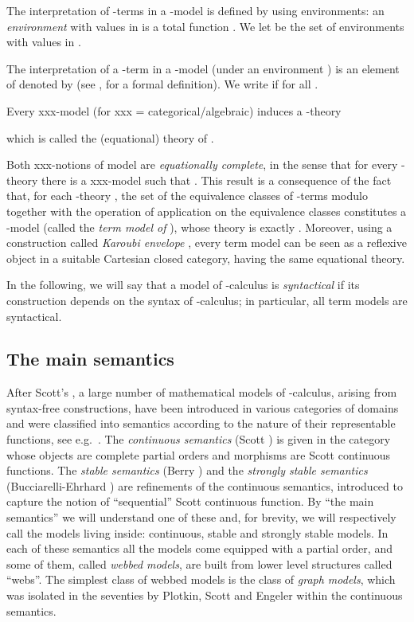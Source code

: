 \documentclass[english]{llncs}
\begin{document}
The interpretation of -terms in a -model  is defined by using environments:
an {\em environment} with values in  is a total function .
We let  be the set of environments with values in .

The interpretation of a -term  in a -model  (under an environment ) is an element of  denoted by  (see \cite[Def.~5.2.1(ii)]{Bare}, for a formal definition).
We write  if  for all .

Every {\sf xxx}-model  (for {\sf xxx} = categorical/algebraic) induces a -theory 

which is called the (equational) theory of .

Both {\sf xxx}-notions of model are {\em equationally complete}, in the sense that for every -theory  there is a {\sf xxx}-model  such that .
This result is a consequence of the fact that, for each -theory , the set of the equivalence classes of -terms modulo 
 together with the operation of application on the equivalence classes constitutes a -model  (called the {\em term model of }), 
whose theory is exactly  \cite[Cor.~5.2.13(ii)]{Bare}.
Moreover, using a construction called {\em Karoubi envelope} \cite[Def.~5.5.11]{Bare}, 
every term model can be seen as a reflexive object in a suitable Cartesian closed category, having the same equational theory.

In the following, we will say that a model of -calculus is \emph{syntactical} if its construction depends on the syntax of -calculus;
in particular, all term models are syntactical.

\subsection{The main semantics}\label{subs:mainsem}

After Scott's , a large number of mathematical models of -calculus, arising from syntax-free constructions, have been introduced 
in various categories of domains and were classified into semantics according to the nature of their representable functions, see e.g.\ \cite{Bare,Berline00,Plotkin93}. 
The {\em continuous semantics} (Scott \cite{Scott72}) is given in the category whose objects are complete partial orders and morphisms are Scott continuous functions. 
The {\em stable semantics} (Berry \cite{Berry78}) and the {\em strongly stable semantics} (Bucciarelli-Ehrhard \cite{BucciarelliE91}) are refinements of the 
continuous semantics, introduced to capture the notion of ``sequential'' Scott continuous function.
By ``the main semantics'' we will understand one of these and, for brevity, we will respectively call the models living inside: 
continuous, stable and strongly stable models.
In each of these semantics all the models come equipped with a partial order, and some of them, called \emph{webbed models}, are built from lower level structures 
called ``webs''.
The simplest class of webbed models is the class of \emph{graph models}, which was isolated in the seventies by Plotkin, Scott and Engeler within the continuous semantics. 
\end{document}
